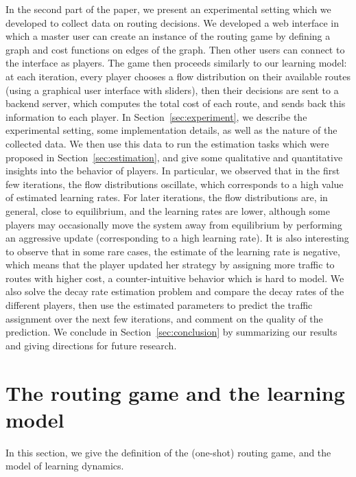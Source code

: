 \documentclass{sig-alternate-ipsn13}
\begin{document}
In the second part of the paper, we present an experimental setting which we developed to collect data on routing decisions. We developed a web interface in which a master user can create an instance of the routing game by defining a graph and cost functions on edges of the graph. Then other users can connect to the interface as players. The game then proceeds similarly to our learning model: at each iteration, every player chooses a flow distribution on their available routes (using a graphical user interface with sliders), then their decisions are sent to a backend server, which computes the total cost of each route, and sends back this information to each player. In Section~\ref{sec:experiment}, we describe the experimental setting, some implementation details, as well as the nature of the collected data. We then use this data to run the estimation tasks which were proposed in Section~\ref{sec:estimation}, and give some qualitative and quantitative insights into the behavior of players. In particular, we observed that in the first few iterations, the flow distributions oscillate, which corresponds to a high value of estimated learning rates. For later iterations, the flow distributions are, in general, close to equilibrium, and the learning rates are lower, although some players may occasionally move the system away from equilibrium by performing an aggressive update (corresponding to a high learning rate). It is also interesting to observe that in some rare cases, the estimate of the learning rate is negative, which means that the player updated her strategy by assigning more traffic to routes with higher cost, a counter-intuitive behavior which is hard to model. We also solve the decay rate estimation problem and compare the decay rates of the different players, then use the estimated parameters to predict the traffic assignment over the next few iterations, and comment on the quality of the prediction. We conclude in Section~\ref{sec:conclusion} by summarizing our results and giving directions for future research.

\section{The routing game and the learning model}
\label{sec:model}
In this section, we give the definition of the (one-shot) routing game, and the model of learning dynamics.
\end{document}
